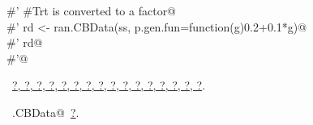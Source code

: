 \documentclass[reqno]{amsart}
\renewcommand{\NWlink}[2]{\hyperlink{#1}{#2}}
\begin{document}
\begin{flushleft}
\begin{list}{}{}
\mbox{}\verb@#' #Trt is converted to a factor@\\
\mbox{}\verb@#' rd <- ran.CBData(ss, p.gen.fun=function(g)0.2+0.1*g)@\\
\mbox{}\verb@#' rd@\\
\mbox{}\verb@#'@\\
\mbox{}\verb@@{\NWsep}
\end{list}
\vspace{-1.5ex}
\footnotesize
\begin{list}{}{\setlength{\itemsep}{-\parsep}\setlength{\itemindent}{-\leftmargin}}
\item \NWtxtFileDefBy\ \NWlink{nuweb?}{?}\NWlink{nuweb?}{, ?}\NWlink{nuweb?}{, ?}\NWlink{nuweb?}{, ?}\NWlink{nuweb?}{, ?}\NWlink{nuweb?}{, ?}\NWlink{nuweb?}{, ?}\NWlink{nuweb?}{, ?}\NWlink{nuweb?}{, ?}\NWlink{nuweb?}{, ?}\NWlink{nuweb?}{, ?}\NWlink{nuweb?}{, ?}\NWlink{nuweb?}{, ?}\NWlink{nuweb?}{, ?}\NWlink{nuweb?}{, ?}\NWlink{nuweb?}{, ?}.
\item \NWtxtIdentsUsed\nobreak\  \verb@ran.CBData@\nobreak\ \NWlink{nuweb?}{?}.
\item{}
\end{list}
\vspace{4ex}
\end{flushleft}
\end{document}
